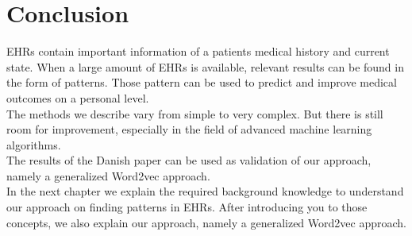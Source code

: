 \section{Conclusion}

EHRs contain important information of a patients medical history and current state. When a large amount of EHRs is available, relevant results can be found in the form of patterns. Those pattern can be used to predict and improve medical outcomes on a personal level. \\
The methods we describe vary from simple to very complex. But there is still room for improvement, especially in the field of advanced machine learning algorithms. \\
The results of the Danish paper can be used as validation of our approach, namely a generalized Word2vec approach. \\

In the next chapter we explain the required background knowledge to understand our approach on finding patterns in EHRs. After introducing you to those concepts, we also explain our approach, namely a generalized Word2vec approach.


